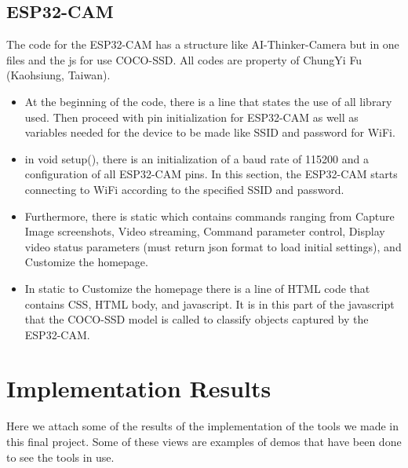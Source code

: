 \documentclass[conference]{IEEEtran}
\begin{document}
\subsection{ESP32-CAM}
The code for the ESP32-CAM has a structure like AI-Thinker-Camera but in one files and the js for use COCO-SSD. All codes are property of ChungYi Fu (Kaohsiung, Taiwan).
\begin{itemize}
\item At the beginning of the code, there is a line that states the use of all library used. Then proceed with pin initialization for ESP32-CAM as well as variables needed for the device to be made like SSID and password for WiFi.
\item in void setup(), there is an initialization of a baud rate of 115200 and a configuration of all ESP32-CAM pins. In this section, the ESP32-CAM starts connecting to WiFi according to the specified SSID and password.
\item Furthermore, there is static which contains commands ranging from Capture Image screenshots, Video streaming, Command parameter control, Display video status parameters (must return json format to load initial settings), and Customize the homepage.
\item In static to Customize the homepage there is a line of HTML code that contains CSS, HTML body, and javascript. It is in this part of the javascript that the COCO-SSD model is called to classify objects captured by the ESP32-CAM.
\end{itemize}

\section{Implementation Results}
Here we attach some of the results of the implementation of the tools we made in this final project. Some of these views are examples of demos that have been done to see the tools in use.
\end{document}

